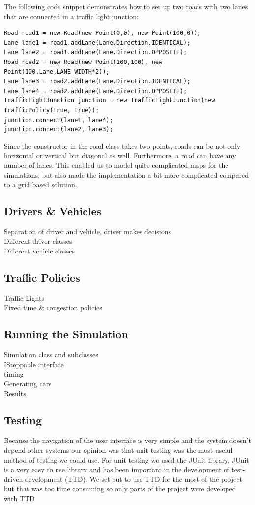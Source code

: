 \documentclass[11pt]{article}
\begin{document}
The following code snippet demonstrates how to set up two roads with two lanes that are connected in a traffic light junction:

\begin{verbatim}
Road road1 = new Road(new Point(0,0), new Point(100,0));
Lane lane1 = road1.addLane(Lane.Direction.IDENTICAL);
Lane lane2 = road1.addLane(Lane.Direction.OPPOSITE);
Road road2 = new Road(new Point(100,100), new Point(100,Lane.LANE_WIDTH*2));
Lane lane3 = road2.addLane(Lane.Direction.IDENTICAL);
Lane lane4 = road2.addLane(Lane.Direction.OPPOSITE);
TrafficLightJunction junction = new TrafficLightJunction(new TrafficPolicy(true, true));
junction.connect(lane1, lane4);
junction.connect(lane2, lane3);
\end{verbatim}

Since the constructor in the road class takes two points, roads can be not only horizontal or vertical but diagonal as well. Furthermore, a road can have any number of lanes. This enabled us to model quite complicated maps for the simulations, but also made the implementation a bit more complicated compared to a grid based solution.

\subsection{Drivers \& Vehicles}

Separation of driver and vehicle, driver makes decisions
\\
Different driver classes
\\
Different vehicle classes

\subsection{Traffic Policies}

Traffic Lights
\\
Fixed time \& congestion policies

\subsection{Running the Simulation}

Simulation class and subclasses
\\
ISteppable interface
\\
timing
\\
Generating cars
\\
Results

\subsection{Testing}
Because the navigation of the user interface is very simple and the system doesn't depend other systems our opinion was that unit testing was the most useful method of testing we could use. For unit testing we used the JUnit library. JUnit is a very easy to use library and has been important in the development of test-driven development (TTD). We set out to use TTD for the most of the project but that was too time consuming so only parts of the project were developed with TTD
\end{document}
